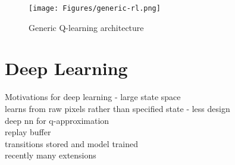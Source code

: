 \begin{figure}
    \centering
    \texttt{[image: Figures/generic-rl.png]}
    \caption{Generic Q-learning architecture\cite{sutton2018reinforcement}} %
    \label{fig:q-learning-generic}
\end{figure}
\section{Deep Learning}
Motivations for deep learning - large state space\\
learns from raw pixels rather than specified state - less design\\
deep nn for q-approximation\\
replay buffer\\
transitions stored and model trained\\
recently many extensions \cite{hessel2018rainbow}
